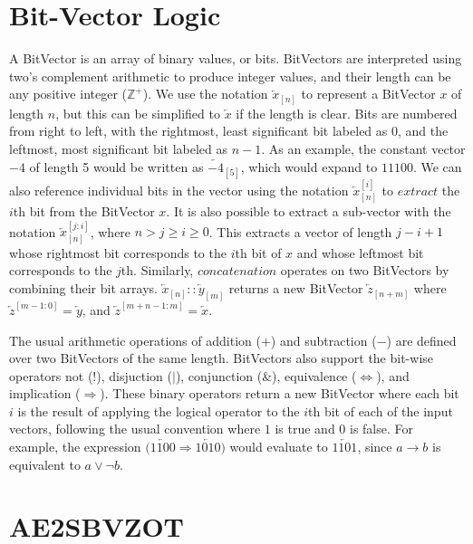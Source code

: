 \documentclass[a4paper,11pt]{report}
\newcommand*\BitAnd{\mathbin{\&}}
\newcommand*\BitOr{\mathbin{|}}
\newcommand{\BitNeg}{!}
\theoremstyle{definition}
\begin{document}
\section{Bit-Vector Logic}\label{bvlogic}
A BitVector is an array of binary values, or bits. BitVectors are interpreted
using two's complement arithmetic to produce integer values, and their length
can be any positive integer (\(\mathbb{Z}^+\)). We use the notation
\(\overleftarrow{x}_{[n]}\) to represent a BitVector \(x\) of length \(n\), but
this can be simplified to \(\overleftarrow{x}\) if the length is clear. Bits are
numbered from right to left, with the rightmost, least significant bit labeled
as 0, and the leftmost, most significant bit labeled as \(n-1\). As an example,
the constant vector \(-4\) of length 5 would be written as
\(\overleftarrow{-4}_{[5]}\), which would expand to \(11100\). We can also
reference individual bits in the vector using the notation
\(\overleftarrow{x}_{[n]}^{[i]}\) to \(extract\) the \(i\)th bit from the
BitVector \(x\). It is also possible to extract a sub-vector with the notation
\(\overleftarrow{x}_{[n]}^{[j:i]}\), where \(n>j\geq i\geq 0\). This extracts a
vector of length \(j-i+1\) whose rightmost bit corresponds to the \(i\)th bit of
\(x\) and whose leftmost bit corresponds to the \(j\)th. Similarly,
\(concatenation\) operates on two BitVectors by combining their bit arrays.
\(\overleftarrow{x}_{[n]} :: \overleftarrow{y}_{[m]}\) returns a new BitVector
\(\overleftarrow{z}_{[n+m]}\) where \(\overleftarrow{z}^{[m-1:0]} =
\overleftarrow{y}\), and \(\overleftarrow{z}^{[m+n-1:m]} = \overleftarrow{x}\).

The usual arithmetic operations of addition (\(+\)) and subtraction (\(-\)) are
defined over two BitVectors of the same length. BitVectors also support the
bit-wise operators not (\(\BitNeg\)), disjuction (\(\BitOr\)), conjunction (\(\BitAnd\)),
equivalence (\(\iff\)), and implication (\(\Rightarrow\)). These binary operators return a
new BitVector where each bit \(i\) is the result of applying the logical
operator to the \(i\)th bit of each of the input vectors, following the usual
convention where \(1\) is true and \(0\) is false. For example, the expression
\(\big( \overleftarrow{1100} \Rightarrow \overleftarrow{1010} \big) \) would
evaluate to \(\overleftarrow{1101}\), since \(a \rightarrow b\) is equivalent to
\(a \lor \neg b\).

\section{AE2SBVZOT}\label{zot-encoding}
\end{document}
